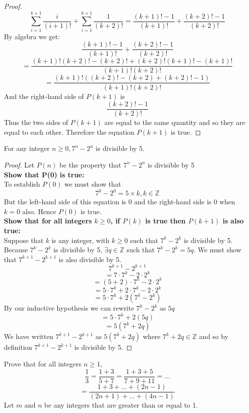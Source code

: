 \documentclass[12pt,letterpaper, onecolumn]{exam}
\begin{document}
\begin{questions}
\begin{solution}
\begin{proof}
		 		 $$\sum_{i=1}^{k+1}\frac{i}{(i+1)!}+\sum_{i=1}^{k+1}\frac{1}{(k+2)!}=\frac{(k+1)!-1}{(k+1)!}+\frac{(k+2)!-1}{(k+2)!}$$
		 		 By algebra we get:
		 		 $$\frac{(k+1)!-1}{(k+1)!}+\frac{(k+2)!-1}{(k+2)!}$$
		 		 $$=\frac{(k+1)!(k+2)!-(k+2)!+(k+2)!(k+1)!-(k+1)!}{(k+1)!(k+2)!}$$
		 		 $$=\frac{(k+1)!\left((k+2)!-(k+2)+(k+2)!-1\right)}{(k+1)!(k+2)!}$$
		 		 And the right-hand side of $P(k+1)$ is
		 		 $$\frac{(k+2)!-1}{(k+2)!}$$
		 		 Thus the two sides of $P(k+1)$ are equal to the same quantity and so they are equal to each other. Therefore the equation $P(k+1)$ is true.
		 	\end{proof}
		 \end{solution}
		 \setcounter{question}{11}\question For any integer $n\geq0, 7^n-2^n$ is divisible by 5.
		 \begin{solution}
		 	\begin{proof}
 				 	Let $P(n)$ be the property that $7^n-2^n$ is divisible by 5\\
 				 		\textbf{Show that P(0) is true:}\\
 				 	To establish $P(0)$ we must show that
 				 	$$7^0-2^0=5\times k, k\in\mathbb{Z}$$
 				 	But the left-hand side of this equation is 0 and the right-hand side is 0 when $k=0$
 				 	also. Hence $P(0)$ is true.\\
					\textbf{Show that for all integers $k\geq0$, if $P(k)$ is true then $P(k+1)$ is also true:}\\
					Suppose that $k$ is any integer, with $k\geq0$ such that $7^k-2^k$ is divisible by 5. Because $7^k-2^k$ is divisible by 5, $\exists q \in \mathbb{Z}$ such that $7^k-2^k=5q$. We must show that $7^{k+1}-2^{k+1}$ is also divisible by 5.
					$$7^{k+1}-2^{k+1}$$
					$$=7\cdot7^k-2\cdot2^k$$
					$$=(5+2)\cdot7^k-2\cdot2^k$$
					$$=5\cdot7^k+2\cdot7^k-2\cdot2^k$$
					$$=5\cdot7^k+2(7^k-2^k)$$
					By our inductive hypothesis we can rewrite $7^k-2^k$ as $5q$
					$$=5\cdot7^k+2(5q)$$
					$$=5(7^k+2q)$$
					We have written  $7^{k+1}-2^{k+1}$ as $5(7^k+2q)$ where $7^k+2q \in \mathbb{Z}$ and so by definition $7^{k+1}-2^{k+1}$ is divisible by 5.
		 \end{proof}
		 \end{solution}
		 \setcounter{question}{27}\question Prove that for all integers $n\geq1,$
		 $$\frac{1}{3}=\frac{1+3}{5+7}=\frac{1+3+5}{7+9+11}=...$$
		 $$=\frac{1+3+...+(2n-1)}{(2n+1)+...+(4n-1)}$$
		 \setcounter{question}{37}\question Let $m$ and $n$ be any integers that are greater than or equal to 1.
		 \begin{parts}

\end{parts}
\end{questions}
\end{document}

